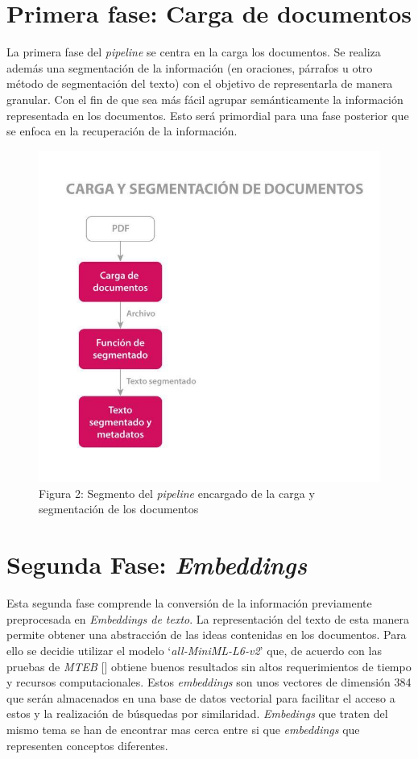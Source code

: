     \section{Primera fase: Carga de documentos} 
    La primera fase del \emph{pipeline} se centra en la carga los documentos. Se realiza además una segmentación de la información (en oraciones, párrafos u otro método de segmentación del texto) con el objetivo de representarla de manera granular. Con el fin de que sea más fácil agrupar semánticamente la información representada en los documentos. Esto será primordial para una fase posterior que se enfoca en la recuperación de la información.

    \begin{figure}[H]    
        \centering
        \includegraphics[scale = 0.25]{Figures/pipeline_1.jpg}
        \caption*{Figura 2: Segmento del \emph{pipeline} encargado de la carga y segmentación de los documentos}
    \end{figure}
    
    \section{Segunda Fase: \emph{Embeddings}}
    Esta segunda fase comprende la conversión de la información previamente preprocesada en \emph{Embeddings de texto}.
    La representación del texto de esta manera permite obtener una abstracción de las ideas contenidas en los documentos. 
    Para ello se decidie utilizar el modelo `\emph{all-MiniML-L6-v2}' que, de acuerdo con las pruebas de \emph{MTEB} [\cite{leaderboard}] obtiene buenos resultados sin altos requerimientos de tiempo y recursos computacionales. Estos \emph{embeddings} son unos vectores de dimensión 384 que serán almacenados en una base de datos vectorial para facilitar el acceso a estos y la realización de búsquedas por similaridad. \emph{Embedings} que traten del mismo tema se han de encontrar mas cerca entre si que \emph{embeddings} que representen conceptos diferentes.


